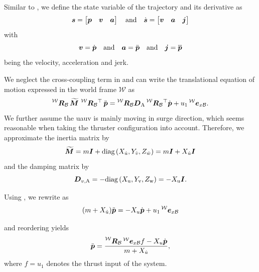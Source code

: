 Similar to \cite{MuellerHehn15}, we define the state variable of the trajectory and its derivative as
\begin{equation}
	\label{eq:trajectory-state}
	\mbox{$\bm{s}$} = 
	\begin{bmatrix}
		\mbox{$\bm{p}$} & \mbox{$\bm{v}$} & \mbox{$\bm{a}$}	
	\end{bmatrix}
	\quad
	\text{and}
	\quad
	\mbox{$\dot{\bm{s}}$} =
	\begin{bmatrix}
		\mbox{$\bm{v}$} &
		\mbox{$\bm{a}$} &
		\mbox{$\bm{j}$}
	\end{bmatrix}
\end{equation}
with
\begin{equation}
	\mbox{$\bm{v}$} = \mbox{$\dot{\bm{p}}$}
	\quad
	\text{and}
	\quad
	\mbox{$\bm{a}$} = \mbox{$\ddot{\bm{p}}$}
	\quad
	\text{and}
	\quad
	\mbox{$\bm{j}$} = \mbox{$\dddot{\bm{p}}$}
\end{equation}
being the velocity, acceleration and jerk.

We neglect the cross-coupling term in  and can write the translational equation of motion expressed in the world frame $\mathcal{W}$ as
\begin{equation}
	\label{eq:eom-world-without-cross-coupling}
	\Rbodyworld \, \Mbs \, \Rbodyworld^\top \, \pbpp = \Rbodyworld\Dadded\Rbodyworld^\top \pbp + u_1 \exbodyinworld.
\end{equation}
We further assume the \ac{uauv} is mainly moving in surge direction, which seems reasonable when taking the thruster configuration into account. Therefore, we approximate the inertia matrix by
\begin{equation}
	\label{eq:added-mass-trajectory-simplification}
	\mbox{$\widetilde{\bm{M}}$} = m\mbox{$\bm{I}$} + \text{diag}\left(X_{\dot{u}}, Y_{\dot{v}}, Z_{\dot{w}}\right)
	=
	m\mbox{$\bm{I}$} + X_{\dot{u}} \mbox{$\bm{I}$}
\end{equation} 
and the damping matrix by
\begin{equation}
	\label{eq:added-damping-trajectory-simplification}
	\mbox{$\bm{D}$}_{v,\text{A}} = -\text{diag}\left(X_\text{u}, Y_\text{v}, Z_\text{w}\right)
	= -X_\text{u} \mbox{$\bm{I}$}
	.
\end{equation} 


Using , we rewrite  as
\begin{equation}
	(m+X_{\dot{u}})\mbox{$\ddot{\bm{p}}$}
	=
	-X_u \mbox{$\dot{\bm{p}}$}
	+ u_1\prescript{\mathcal{W}}{}{\mbox{$\bm{e}$}}_{x\mathcal{B}}
\end{equation}

and reordering yields
\begin{equation}
	\label{eq:trajectory-acceleration-eom}
	\pbpp = \frac{\Rbodyworld \exbodyinworld f - X_u \pbp}{m + X_{\dot{u}}},
\end{equation}
where $f=u_1$ denotes the thrust input of the system.

